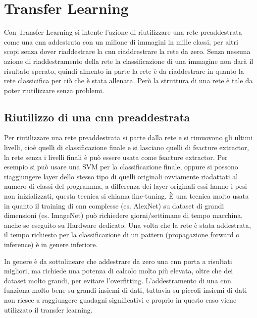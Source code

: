 \chapter{Transfer Learning}\label{transfer-learning}

Con Transfer Learning si intente l'azione di riutilizzare una rete preaddestrata come una \gls{cnn} addestrata con un milione di immagini in mille classi, per altri scopi senza dover riaddestrare la \gls{cnn} riaddrestrare la rete da zero. Senza nessuna azione di riaddestramento della rete la classificazione di una immagine non darà il risultato sperato, quindi almento in parte la rete è da riaddestrare in quanto la rete classicifica per ciò che è stata allenata. Però la struttura di una rete è tale da poter riutilizzare senza problemi. 

\section{Riutilizzo di una \gls{cnn} preaddestrata}\label{riutilizzo-di-una-cnn-preaddestrata}

Per riutilizzare una rete preaddestrata si parte dalla rete e si rimuovono gli ultimi livelli, cioè quelli di classificazione finale e si lasciano quelli di feacture extractor, la rete senza i livelli finali è può essere usata come feacture extractor. Per esempio si può usare una SVM per la classificazione finale, oppure si possono riaggiungere layer dello stesso tipo di quelli originali ovviamente riadattati al numero di classi del programma, a differenza dei layer originali essi hanno i pesi non inizializzati, questa tecnica si chiama fine-tuning. È una tecnica molto usata in quanto il training di \gls{cnn} complesse (es. AlexNet) su dataset di grandi dimensioni (es. ImageNet) può richiedere giorni/settimane di tempo macchina, anche se eseguito su Hardware dedicato. Una volta che la rete è stata addestrata, il tempo richiesto per la classificazione di un  pattern (\gls{propagazione forward} o inference) è in genere inferiore\cite{yosinski_tl}\cite{unibo_maltoni_ml}.

In genere è da sottolineare che addestrare da zero una \gls{cnn} porta a risultati migliori, ma richiede una potenza di calcolo molto più  elevata, oltre che dei dataset molto grandi, per evitare l'\gls{overfitting}. L'addestramento di una \gls{cnn} funziona molto bene su grandi insiemi di dati, tuttavia su piccoli insiemi di dati non riesce a raggiungere guadagni significativi e proprio in questo caso viene utilizzato il transfer learning\cite{joel_tl}.


